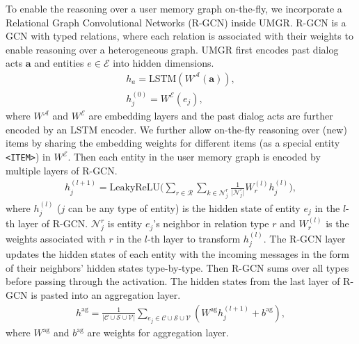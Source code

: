 To enable the reasoning over a user memory graph on-the-fly, we incorporate a Relational Graph Convolutional Networks (R-GCN) \cite{schlichtkrull2018modeling} inside UMGR.
R-GCN is a GCN \cite{kipf2016semi} with typed relations, where each relation is associated with their weights to enable reasoning over a heterogeneous graph.
UMGR first encodes past dialog acts $\boldsymbol{a}$ and entities $e \in \mathcal{E}$ into hidden dimensions.
\begin{equation}
\begin{split}
h_a = \text{LSTM}(W^\mathcal{A}(\boldsymbol{a})), \\
h_j^{(0)} = W^\mathcal{E}(e_j),
\end{split}
\end{equation}
where $W^\mathcal{A}$ and $W^\mathcal{E}$ are embedding layers and the past dialog acts are further encoded by an LSTM encoder.
We further allow on-the-fly reasoning over (new) items by sharing the embedding weights for different items (as a special entity \texttt{<ITEM>}) in $W^\mathcal{E}$. 
Then each entity in the user memory graph is encoded by multiple layers of R-GCN.
\begin{equation}
\begin{split}
h_j^{(l+1)}=\text{LeakyReLU} \Big(\sum_{r \in \mathcal{R}} \sum_{k \in \mathcal{N}_j^r} \frac{1}{\vert \mathcal{N}_j^r \vert} W_r^{(l)} h_j^{(l)}\Big),
\end{split}
\end{equation}
where $h_j^{(l)}$ ($j$ can be any type of entity) is the hidden state of entity $e_j$ in the $l$-th layer of R-GCN. $\mathcal{N}_j^r$ is entity $e_j$'s neighbor in relation type $r$ and $W_r^{(l)}$ is the weights associated with $r$ in the $l$-th layer to transform $h_j^{(l)}$.
The R-GCN layer updates the hidden states of each entity with the incoming messages in the form of their neighbors' hidden states type-by-type.
Then R-GCN sums over all types before passing through the activation.
The hidden states from the last layer of R-GCN is pasted into an aggregation layer.
\begin{equation}
\begin{split}
h^{\text{ag}} = \frac{1}{\vert \mathcal{C} \cup \mathcal{S} \cup \mathcal{V} \vert} \sum_{e_j \in \mathcal{C} \cup \mathcal{S} \cup \mathcal{V}} (W^\text{ag} h_j^{(l+1)} + b^{\text{ag}}),
\end{split}
\end{equation}
where $W^{\text{ag}}$ and $b^{\text{ag}}$ are weights for aggregation layer.
